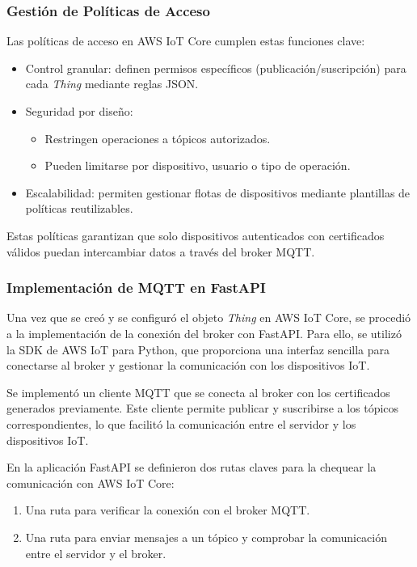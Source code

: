 \subsubsection{Gestión de Políticas de Acceso}

Las políticas de acceso en AWS IoT Core cumplen estas funciones clave:

\begin{itemize}
    \item Control granular: definen permisos específicos (publicación/suscripción) para
          cada \textit{Thing} mediante reglas JSON.

    \item Seguridad por diseño:
          \begin{itemize}
              \item Restringen operaciones a tópicos autorizados.
              \item Pueden limitarse por dispositivo, usuario o tipo de operación.
          \end{itemize}

    \item Escalabilidad: permiten gestionar flotas de dispositivos mediante plantillas de
          políticas reutilizables.
\end{itemize}

Estas políticas garantizan que solo dispositivos autenticados con certificados
válidos puedan intercambiar datos a través del broker MQTT.

\subsubsection{Implementación de MQTT en FastAPI}
Una vez que se creó y se configuró el objeto \textit{Thing} en AWS IoT Core, se
procedió a la implementación de la conexión del broker con FastAPI. Para ello,
se utilizó la SDK de AWS IoT para Python, que proporciona una interfaz sencilla
para conectarse al broker y gestionar la comunicación con los dispositivos IoT.

Se implementó un cliente MQTT que se conecta al broker con los certificados
generados previamente. Este cliente permite publicar y suscribirse a los
tópicos correspondientes, lo que facilitó la comunicación entre el servidor y
los dispositivos IoT.

En la aplicación FastAPI se definieron dos rutas claves para la chequear la
comunicación con AWS IoT Core:

\begin{enumerate}
    \item Una ruta para verificar la conexión con el broker MQTT.
    \item Una ruta para enviar mensajes a un tópico y comprobar la comunicación entre el
          servidor y el broker.
\end{enumerate}

